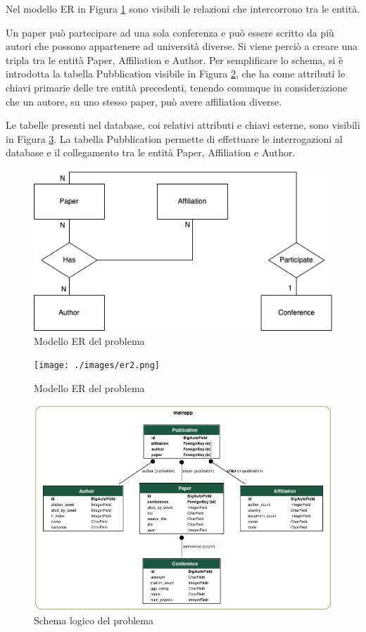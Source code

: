 Nel modello ER in Figura \ref{fig:er1} sono visibili le relazioni che intercorrono tra le entità.

Un paper può partecipare ad una sola conferenza e può essere scritto da più autori che possono appartenere ad università diverse.
Si viene perciò a creare una tripla tra le entità Paper, Affiliation e Author. 
Per semplificare lo schema, si è introdotta la tabella Pubblication visibile in Figura \ref{fig:er2}, che ha come attributi 
le chiavi primarie delle tre entità precedenti, tenendo comunque in considerazione che un autore, su uno stesso paper, 
può avere affiliation diverse.

Le tabelle presenti nel database, coi relativi attributi e chiavi esterne, sono visibili in Figura \ref{fig:logico}.
La tabella Pubblication permette di effettuare le interrogazioni al database e il collegamento tra le entità Paper, Affiliation e Author.


\begin{figure}[h!]
    \centering
    \includegraphics[width=0.8\linewidth]{./images/er1.png}
    \caption{Modello ER del problema}
    \label{fig:er1}
\end{figure}

\begin{figure}[h!]
    \centering
    \texttt{[image: ./images/er2.png]}
    \caption{Modello ER del problema}
    \label{fig:er2}
\end{figure}


\begin{figure}[h!]
    \centering
    \includegraphics[width=0.8\linewidth]{./images/logico.png}
    \caption{Schema logico del problema}
    \label{fig:logico}
\end{figure}